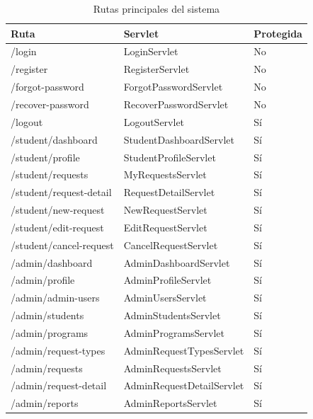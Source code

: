 \documentclass[12pt,letterpaper]{article}
\newcommand{\code}[1]{\texorpdfstring{\begingroup\normalfont\normalsize\def\_{\textunderscore\allowbreak}#1\endgroup}{#1}}
\begin{document}
\begin{longtable}{|p{}|p{}|p{}|}
\caption{Rutas principales del sistema}\\
\hline
\textbf{Ruta} & \textbf{Servlet} & \textbf{Protegida} \\
\hline
\code{/login} & \code{LoginServlet} & No \\
\hline
\code{/register} & \code{RegisterServlet} & No \\
\hline
\code{/forgot-password} & \code{ForgotPasswordServlet} & No \\
\hline
\code{/recover-password} & \code{RecoverPasswordServlet} & No \\
\hline
\code{/logout} & \code{LogoutServlet} & Sí \\
\hline
\code{/student/dashboard} & \code{StudentDashboardServlet} & Sí \\
\hline
\code{/student/profile} & \code{StudentProfileServlet} & Sí \\
\hline
\code{/student/requests} & \code{MyRequestsServlet} & Sí \\
\hline
\code{/student/request-detail} & \code{RequestDetailServlet} & Sí \\
\hline
\code{/student/new-request} & \code{NewRequestServlet} & Sí \\
\hline
\code{/student/edit-request} & \code{EditRequestServlet} & Sí \\
\hline
\code{/student/cancel-request} & \code{CancelRequestServlet} & Sí \\
\hline
\code{/admin/dashboard} & \code{AdminDashboardServlet} & Sí \\
\hline
\code{/admin/profile} & \code{AdminProfileServlet} & Sí \\
\hline
\code{/admin/admin-users} & \code{AdminUsersServlet} & Sí \\
\hline
\code{/admin/students} & \code{AdminStudentsServlet} & Sí \\
\hline
\code{/admin/programs} & \code{AdminProgramsServlet} & Sí \\
\hline
\code{/admin/request-types} & \code{AdminRequestTypesServlet} & Sí \\
\hline
\code{/admin/requests} & \code{AdminRequestsServlet} & Sí \\
\hline
\code{/admin/request-detail} & \code{AdminRequestDetailServlet} & Sí \\
\hline
\code{/admin/reports} & \code{AdminReportsServlet} & Sí \\
\hline
\end{longtable}
\end{document}

